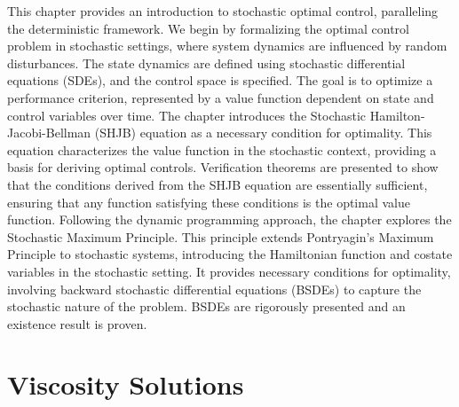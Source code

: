 \documentclass[12pt,a4paper,oneside]{book}
\numberwithin{theorem}{section}
\numberwithin{definition}{section}
\numberwithin{example}{section}
\numberwithin{exercise}{section}
\begin{document}
This chapter provides an introduction to stochastic optimal control, paralleling the deterministic framework. We begin by formalizing the optimal control problem in stochastic settings, where system dynamics are influenced by random disturbances. The state dynamics are defined using stochastic differential equations (SDEs), and the control space is specified. The goal is to optimize a performance criterion, represented by a value function dependent on state and control variables over time. The chapter introduces the Stochastic Hamilton-Jacobi-Bellman (SHJB) equation as a necessary condition for optimality. This equation characterizes the value function in the stochastic context, providing a basis for deriving optimal controls. Verification theorems are presented to show that the conditions derived from the SHJB equation are essentially sufficient, ensuring that any function satisfying these conditions is the optimal value function. Following the dynamic programming approach, the chapter explores the Stochastic Maximum Principle. This principle extends Pontryagin's Maximum Principle to stochastic systems, introducing the Hamiltonian function and costate variables in the stochastic setting. It provides necessary conditions for optimality, involving backward stochastic differential equations (BSDEs) to capture the stochastic nature of the problem. BSDEs are rigorously presented and an existence result is proven.







\newpage

\chapter{Viscosity Solutions}
\end{document}
